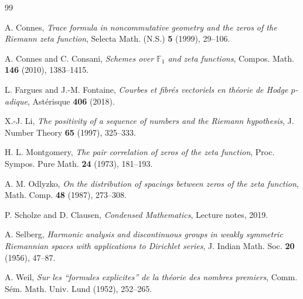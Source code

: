 \documentclass[12pt, a4paper]{article}
\theoremstyle{definition}
\begin{document}
\begin{thebibliography}{99}

A. Connes, \textit{Trace formula in noncommutative geometry and the zeros of the Riemann zeta function}, Selecta Math. (N.S.) \textbf{5} (1999), 29--106.

A. Connes and C. Consani, \textit{Schemes over $\mathbb{F}_1$ and zeta functions}, Compos. Math. \textbf{146} (2010), 1383--1415.

L. Fargues and J.-M. Fontaine, \textit{Courbes et fibr\'es vectoriels en th\'eorie de Hodge $p$-adique}, Ast\'erisque \textbf{406} (2018).

X.-J. Li, \textit{The positivity of a sequence of numbers and the Riemann hypothesis}, J. Number Theory \textbf{65} (1997), 325--333.

H. L. Montgomery, \textit{The pair correlation of zeros of the zeta function}, Proc. Sympos. Pure Math. \textbf{24} (1973), 181--193.

A. M. Odlyzko, \textit{On the distribution of spacings between zeros of the zeta function}, Math. Comp. \textbf{48} (1987), 273--308.

P. Scholze and D. Clausen, \textit{Condensed Mathematics}, Lecture notes, 2019.

A. Selberg, \textit{Harmonic analysis and discontinuous groups in weakly symmetric Riemannian spaces with applications to Dirichlet series}, J. Indian Math. Soc. \textbf{20} (1956), 47--87.

A. Weil, \textit{Sur les ``formules explicites'' de la th\'eorie des nombres premiers}, Comm. S\'em. Math. Univ. Lund (1952), 252--265.

\end{thebibliography}
\end{document}
